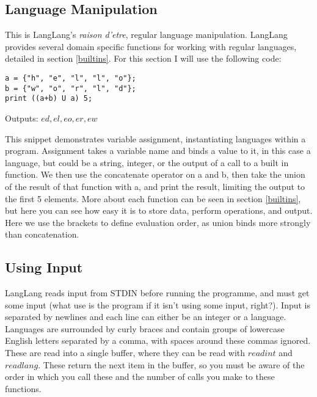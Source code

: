 \subsection{Language Manipulation}
\begin{normalsize}
This is LangLang's \textit{raison d'etre}, regular language manipulation. LangLang provides several domain specific functions for working with regular languages, detailed in section \ref{builtins}. For this section I will use the following code:
\begin{center}
\begin{minipage}{8cm}
\begin{verbatim}
a = {"h", "e", "l", "l", "o"};
b = {"w", "o", "r", "l", "d"};
print ((a+b) U a) 5;
\end{verbatim}
\end{minipage}
\end{center}
Outputs: ${ed, el, eo, er, ew}$

This snippet demonstrates variable assignment, instantiating languages within a program. Assignment takes a variable name and binds a value to it, in this case a language, but could be a string, integer, or the output of a call to a built in function. We then use the concatenate operator on a and b, then take the union of the result of that function with a, and print the result, limiting the output to the first 5 elements. More about each function can be seen in section \ref{builtins}, but here you can see how easy it is to store data, perform operations, and output. Here we use the brackets to define evaluation order, as union binds more strongly than concatenation.
\end{normalsize}

\subsection{Using Input}
\label{input}
\begin{normalsize}
LangLang reads input from STDIN before running the programme, and must get some input (what use is the program if it isn't using some input, right?). Input is separated by newlines and each line can either be an integer or a language. Languages are surrounded by curly braces and contain groups of lowercase English letters separated by a comma, with spaces around these commas ignored. These are read into a single buffer, where they can be read with $readint$ and $readlang$. These return the next item in the buffer, so you must be aware of the order in which you call these and the number of calls you make to these functions.
\end{normalsize}
